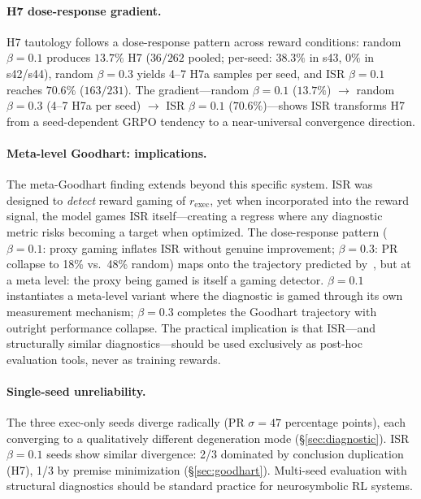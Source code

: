 \paragraph{H7 dose-response gradient.}
H7 tautology follows a dose-response pattern across reward conditions: random $\beta{=}0.1$ produces $13.7\%$ H7 ($36/262$ pooled; per-seed: $38.3\%$ in s43, $0\%$ in s42/s44), random $\beta{=}0.3$ yields 4--7 H7a samples per seed, and ISR $\beta{=}0.1$ reaches $70.6\%$ ($163/231$).
The gradient---random $\beta{=}0.1$ ($13.7\%$) $\to$ random $\beta{=}0.3$ (4--7 H7a per seed) $\to$ ISR $\beta{=}0.1$ ($70.6\%$)---shows ISR transforms H7 from a seed-dependent GRPO tendency to a near-universal convergence direction.

\paragraph{Meta-level Goodhart: implications.}
The meta-Goodhart finding extends beyond this specific system.
ISR was designed to \emph{detect} reward gaming of $r_{\text{exec}}$, yet when incorporated into the reward signal, the model games ISR itself---creating a regress where any diagnostic metric risks becoming a target when optimized.
The dose-response pattern ($\beta{=}0.1$: proxy gaming inflates ISR without genuine improvement; $\beta{=}0.3$: PR collapse to 18\% vs.\ 48\% random) maps onto the trajectory predicted by~\cite{gao-reward-overoptimization}, but at a meta level: the proxy being gamed is itself a gaming detector.
$\beta{=}0.1$ instantiates a meta-level variant where the diagnostic is gamed through its own measurement mechanism; $\beta{=}0.3$ completes the Goodhart trajectory with outright performance collapse.
The practical implication is that ISR---and structurally similar diagnostics---should be used exclusively as post-hoc evaluation tools, never as training rewards.

\paragraph{Single-seed unreliability.}
The three exec-only seeds diverge radically (PR $\sigma{=}47$ percentage points), each converging to a qualitatively different degeneration mode (\S\ref{sec:diagnostic}).
ISR $\beta{=}0.1$ seeds show similar divergence: 2/3 dominated by conclusion duplication (H7), 1/3 by premise minimization (\S\ref{sec:goodhart}).
Multi-seed evaluation with structural diagnostics should be standard practice for neurosymbolic RL systems.


